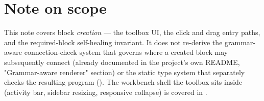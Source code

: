 \documentclass[11pt]{article}
\begin{document}
\section*{Note on scope}
This note covers block \emph{creation} --- the toolbox UI, the click and
drag entry paths, and the required-block self-healing invariant. It does
not re-derive the grammar-aware connection-check system that governs where
a created block may subsequently connect (already documented in the
project's own README, "Grammar-aware renderer" section) or the static type
system that separately checks the resulting program
(\texttt{}). The workbench shell the
toolbox sits inside (activity bar, sidebar resizing, responsive collapse)
is covered in \texttt{}.
\end{document}
